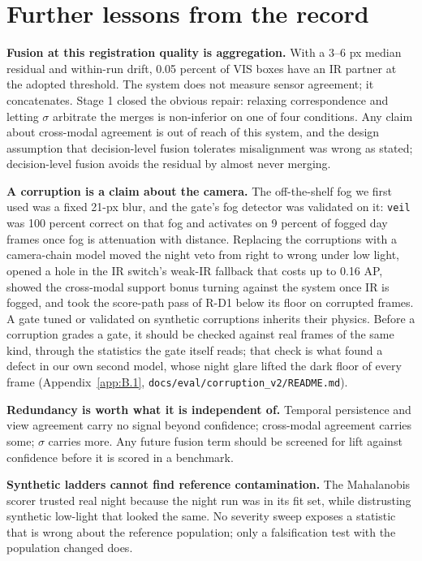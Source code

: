 \documentclass[10pt]{article}
\begin{document}
\section{Further lessons from the record}\label{app:J}
\textbf{Fusion at this registration quality is aggregation.} With a 3--6 px median residual and within-run drift, 0.05 percent of VIS boxes have an IR partner at the adopted threshold. The system does not measure sensor agreement; it concatenates. Stage 1 closed the obvious repair: relaxing correspondence and letting $\sigma$ arbitrate the merges is non-inferior on one of four conditions. Any claim about cross-modal agreement is out of reach of this system, and the design assumption that decision-level fusion tolerates misalignment was wrong as stated; decision-level fusion avoids the residual by almost never merging.

\textbf{A corruption is a claim about the camera.} The off-the-shelf fog we first used was a fixed 21-px blur, and the gate's fog detector was validated on it: \texttt{veil} was 100 percent correct on that fog and activates on 9 percent of fogged day frames once fog is attenuation with distance. Replacing the corruptions with a camera-chain model moved the night veto from right to wrong under low light, opened a hole in the IR switch's weak-IR fallback that costs up to 0.16 AP, showed the cross-modal support bonus turning against the system once IR is fogged, and took the score-path pass of R-D1 below its floor on corrupted frames. A gate tuned or validated on synthetic corruptions inherits their physics. Before a corruption grades a gate, it should be checked against real frames of the same kind, through the statistics the gate itself reads; that check is what found a defect in our own second model, whose night glare lifted the dark floor of every frame (Appendix~\ref{app:B.1}, \texttt{docs/\allowbreak{}eval/\allowbreak{}corruption\_\allowbreak{}v2/\allowbreak{}README.md}).

\textbf{Redundancy is worth what it is independent of.} Temporal persistence and view agreement carry no signal beyond confidence; cross-modal agreement carries some; $\sigma$ carries more. Any future fusion term should be screened for lift against confidence before it is scored in a benchmark.

\textbf{Synthetic ladders cannot find reference contamination.} The Mahalanobis scorer trusted real night because the night run was in its fit set, while distrusting synthetic low-light that looked the same. No severity sweep exposes a statistic that is wrong about the reference population; only a falsification test with the population changed does.
\end{document}
